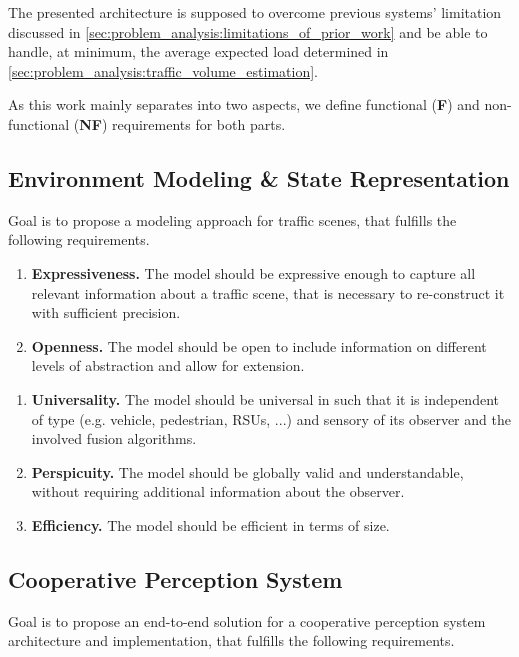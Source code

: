 The presented architecture is supposed to overcome previous systems' limitation discussed in \autoref{sec:problem_analysis:limitations_of_prior_work} and be able to handle, at minimum, the average expected load determined in \autoref{sec:problem_analysis:traffic_volume_estimation}.

As this work mainly separates into two aspects, we define functional (\textbf{F}) and non-functional (\textbf{NF}) requirements for both parts.

\subsection{Environment Modeling \& State Representation}
\label{subsec:problem_analysis:environment_modeling_state_representation}

Goal is to propose a modeling approach for traffic scenes, that fulfills the following requirements. 

\begin{enumerate}[F-M1:\ \ ]
	\item \textbf{Expressiveness.} The model should be expressive enough to capture all relevant information about a traffic scene, that is necessary to re-construct it with sufficient precision.
	\item \textbf{Openness.} The model should be open to include information on different levels of abstraction and allow for extension.
\end{enumerate}
\begin{enumerate}[NF-M1:]
	\item \textbf{Universality.} The model should be universal in such that it is independent of type (e.g. vehicle, pedestrian, RSUs, ...) and sensory of its observer and the involved fusion algorithms.
	\item \textbf{Perspicuity.} The model should be globally valid and understandable, without requiring additional information about the observer.
	\item \textbf{Efficiency.} The model should be efficient in terms of size.
\end{enumerate}

\subsection{Cooperative Perception System}
\label{subsec:problem_analysis:cooperative_perception_system}

Goal is to propose an end-to-end solution for a cooperative perception system architecture and implementation, that fulfills the following requirements. 

